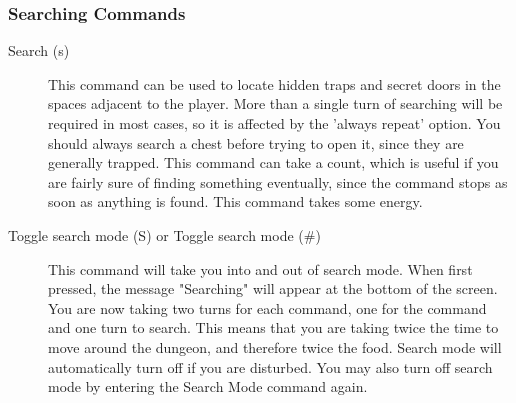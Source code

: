\subsubsection{Searching Commands}
\begin{description}
\item[Search (s)]
  This command can be used to locate hidden traps and secret doors
  in the spaces adjacent to the player. More than a single turn of
  searching will be required in most cases, so it is affected by
  the 'always repeat' option. You should always search a chest
  before trying to open it, since they are generally trapped. This
  command can take a count, which is useful if you are fairly sure
  of finding something eventually, since the command stops as soon
  as anything is found. This command takes some energy.
  
\item[Toggle search mode (S) or Toggle search mode (\#)] This command
  will take you into and out of search mode. When first pressed,
  the message "Searching" will appear at the bottom of the screen.
  You are now taking two turns for each command, one for the
  command and one turn to search. This means that you are taking
  twice the time to move around the dungeon, and therefore twice
  the food. Search mode will automatically turn off if you are
  disturbed. You may also turn off search mode by entering the
  Search Mode command again.
\end{description}


